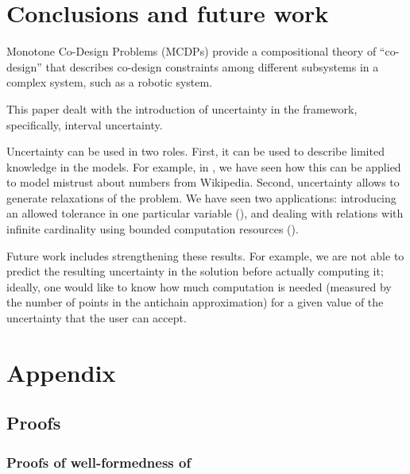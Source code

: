 \documentclass[twocolumn,english]{IEEEconf}
\theoremstyle{plain}
\theoremstyle{definition}
\theoremstyle{definition}
\theoremstyle{plain}
\begin{document}
\section{Conclusions and future work}

Monotone Co-Design Problems (MCDPs) provide a compositional theory
of ``co-design'' that describes co-design constraints among different
subsystems in a complex system, such as a robotic system.

This paper dealt with the introduction of uncertainty in the framework,
specifically, interval uncertainty. 

Uncertainty can be used in two roles. First, it can be used to describe
limited knowledge in the models. For example, in ,
we have seen how this can be applied to model mistrust about numbers
from Wikipedia. Second, uncertainty allows to generate relaxations
of the problem. We have seen two applications: introducing an allowed
tolerance in one particular variable (),
and dealing with relations with infinite cardinality using bounded
computation resources ().

Future work includes strengthening these results. For example, we
are not able to predict the resulting uncertainty in the solution
before actually computing it; ideally, one would like to know how
much computation is needed (measured by the number of points in the
antichain approximation) for a given value of the uncertainty that
the user can accept.

{

\footnotesize



\setcounter{page}{1}


\printbibliography

}

\clearpage

\appendix

\section{{\normalsize{}Appendix}}

\subsection{Proofs}

\subsubsection{Proofs of well-formedness of }
\end{document}
